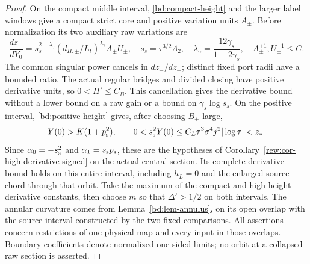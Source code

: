 \begin{proof}
On the compact middle interval, \eqref{bd:compact-height} and the
larger label windows give a compact strict core and positive variation
units $A_\pm$. Before normalization its two auxiliary raw variations are
\begin{equation}\label{bd:compact-raw-variation}
 \frac{dz_\pm}{dY_0}
 =s_s^{2-\lambda_\gamma}(d_{H,\pm}/L_t)^{\lambda_\gamma}A_\pm U_\pm,
 \quad s_s=\tau^{3/2}\Lambda_2,\quad
 \lambda_\gamma=\frac{12\gamma_s}{1+2\gamma_s},\quad
 A_\pm^{\pm1},U_\pm^{\pm1}\le C.
\end{equation}
The common singular power cancels in $dz_-/dz_+$; distinct fixed
port radii have a bounded ratio. The actual regular bridges and divided
closing have positive derivative units, so $0<\Pi'\le C_B$.
This cancellation gives the derivative bound without a lower bound on a
raw gain or a bound on $\gamma_s\log s_s$.
On the positive interval, \eqref{bd:positive-height} gives, after
choosing \(B_+\) large,
\[
 Y(0)>K(1+p_{\rm s}^2),\qquad
 0<s_{\rm s}^2Y(0)\le C_L\tau^3\sigma^4j^2|\log\tau|<z_*.
\]
Since \(\alpha_0=-s_{\rm s}^2\) and
\(\alpha_1=s_{\rm s}p_{\rm s}\), these are the hypotheses of
Corollary~\ref{rew:cor-high-derivative-signed} on the actual central
section. Its complete derivative bound holds on this entire interval,
including \(h_L=0\) and the enlarged source chord through that orbit.
Take the maximum of the compact and high-height derivative constants,
then choose \(m\) so that \(\Delta'>1/2\) on both intervals.
The annular curvature comes from Lemma~\ref{bd:lem-annulus}, on its
open overlap with the source interval constructed by the two fixed
comparisons. All assertions concern restrictions of one physical
map and every input in those overlaps. Boundary coefficients denote
normalized one-sided limits; no orbit at a collapsed raw section is
asserted.
\end{proof}
